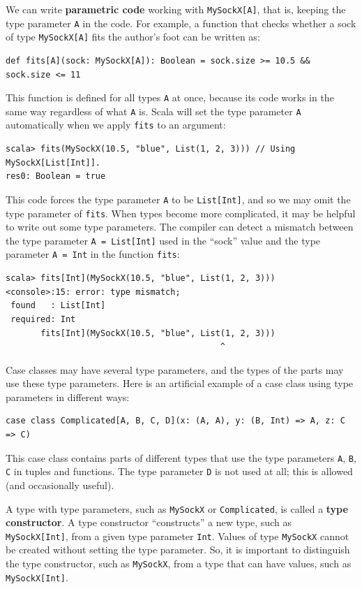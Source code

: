 We can write \textbf{parametric code} working
with \lstinline!MySockX[A]!, that is, keeping the type parameter
\lstinline!A! in the code. For example, a function that checks whether
a sock of type \lstinline!MySockX[A]! fits the author\textsf{'}s foot can
be written as:
\begin{lstlisting}
def fits[A](sock: MySockX[A]): Boolean = sock.size >= 10.5 && sock.size <= 11
\end{lstlisting}
This function is defined for all types \lstinline!A! at once, because
its code works in the same way regardless of what \lstinline!A! is.
Scala will set the type parameter \lstinline!A! automatically when
we apply \lstinline!fits! to an argument:
\begin{lstlisting}
scala> fits(MySockX(10.5, "blue", List(1, 2, 3))) // Using MySockX[List[Int]].
res0: Boolean = true
\end{lstlisting}
This code forces the type parameter \lstinline!A! to be \lstinline!List[Int]!,
and so we may omit the type parameter of \lstinline!fits!. When types
become more complicated, it may be helpful to write out some type
parameters. The compiler can detect a mismatch between the type parameter
\lstinline!A = List[Int]! used in the \textsf{``}sock\textsf{''} value and the type
parameter \lstinline!A = Int! in the function \lstinline!fits!:
\begin{lstlisting}
scala> fits[Int](MySockX(10.5, "blue", List(1, 2, 3)))
<console>:15: error: type mismatch;
 found   : List[Int]
 required: Int
       fits[Int](MySockX(10.5, "blue", List(1, 2, 3)))
                                           ^ 
\end{lstlisting}

Case classes may have several type parameters, and the types of the
parts may use these type parameters. Here is an artificial example
of a case class using type parameters in different ways:
\begin{lstlisting}
case class Complicated[A, B, C, D](x: (A, A), y: (B, Int) => A, z: C => C)
\end{lstlisting}
This case class contains parts of different types that use the type
parameters \lstinline!A!, \lstinline!B!, \lstinline!C! in tuples
and functions. The type parameter \lstinline!D! is not used at all;
this is allowed (and occasionally useful).

A type with type parameters, such as \lstinline!MySockX! or \lstinline!Complicated!,
is called a \textbf{type constructor}. A
type constructor \textsf{``}constructs\textsf{''} a new type, such as \lstinline!MySockX[Int]!,
from a given type parameter \lstinline!Int!. Values of type \lstinline!MySockX!
cannot be created without setting the type parameter. So, it is important
to distinguish the type constructor, such as \lstinline!MySockX!,
from a type that can have values, such as \lstinline!MySockX[Int]!.

